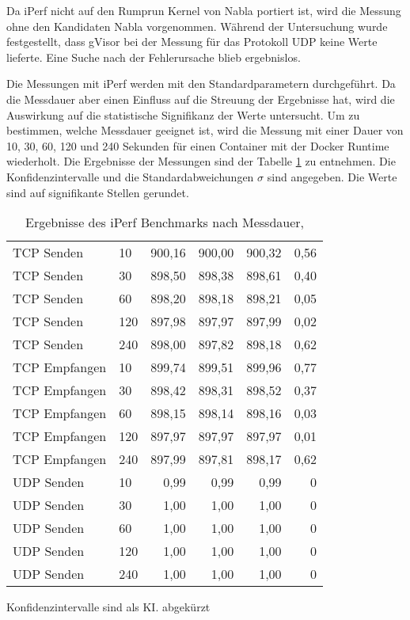 Da iPerf nicht auf den Rumprun Kernel von Nabla portiert ist, wird die Messung ohne den Kandidaten Nabla vorgenommen. Während der Untersuchung wurde festgestellt, dass gVisor bei der Messung für das Protokoll \ac{UDP} keine Werte lieferte. Eine Suche nach der Fehlerursache blieb ergebnislos. 

Die Messungen mit iPerf werden mit den Standardparametern durchgeführt. Da die Messdauer aber einen Einfluss auf die Streuung der Ergebnisse hat, wird die Auswirkung auf die statistische Signifikanz der Werte untersucht.
Um zu bestimmen, welche Messdauer geeignet ist, wird die Messung mit einer Dauer von 10, 30, 60, 120 und 240 Sekunden für einen Container mit der Docker Runtime wiederholt. 
Die Ergebnisse der Messungen sind der Tabelle \ref{tbl:iperfdauer} zu entnehmen. Die Konfidenzintervalle und die Standardabweichungen $\sigma$ sind angegeben. Die Werte sind auf signifikante Stellen gerundet.

\begin{table}[ht]
	\myfloatalign
	\small 
	\begin{tabularx}{\textwidth}{Xlrrrr} \hline
		\spacedlowsmallcaps{Messung}  &
		\spacedlowsmallcaps{Dauer [s]} &  \spacedlowsmallcaps{\O [MB/s]} & \spacedlowsmallcaps{KI unten} & \spacedlowsmallcaps{KI oben} & \spacedlowsmallcaps{$\sigma$} \\ \hline
TCP Senden & 10 & 900,16 & 900,00 & 900,32 & 0,56 \\
TCP Senden & 30 & 898,50 & 898,38 & 898,61 & 0,40 \\
TCP Senden & 60 & 898,20 & 898,18 & 898,21 & 0,05 \\
TCP Senden & 120 & 897,98 & 897,97 & 897,99 & 0,02 \\
TCP Senden & 240 & 898,00 & 897,82 & 898,18 & 0,62 \\ \hline
TCP Empfangen & 10 & 899,74 & 899,51 & 899,96 & 0,77 \\
TCP Empfangen & 30 & 898,42 & 898,31 & 898,52 & 0,37 \\
TCP Empfangen & 60 & 898,15 & 898,14 & 898,16 & 0,03 \\
TCP Empfangen & 120 & 897,97 & 897,97 & 897,97 & 0,01 \\
TCP Empfangen & 240 & 897,99 & 897,81 & 898,17 & 0,62 \\ \hline
UDP Senden & 10 & 0,99 & 0,99 & 0,99 & 0 \\
UDP Senden & 30 & 1,00 & 1,00 & 1,00 & 0 \\
UDP Senden & 60 & 1,00 & 1,00 & 1,00 & 0 \\
UDP Senden & 120 & 1,00 & 1,00 & 1,00 & 0 \\
UDP Senden & 240 & 1,00 & 1,00 & 1,00 & 0 \\ \hline
	\end{tabularx}
	\caption[Ergebnisse des iPerf Benchmarks nach Messdauer]{Ergebnisse des iPerf Benchmarks nach Messdauer,}
	\footnotesize Konfidenzintervalle sind als KI. abgekürzt
	\label{tbl:iperfdauer}
\end{table}

